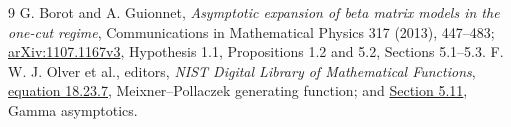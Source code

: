 \documentclass[11pt]{article}
\begin{document}
\begin{thebibliography}{9}
 G. Borot and A. Guionnet,
\emph{Asymptotic expansion of beta matrix models in the one-cut regime},
Communications in Mathematical Physics 317 (2013), 447--483;
\href{https://arxiv.org/abs/1107.1167}{arXiv:1107.1167v3},
Hypothesis 1.1, Propositions 1.2 and 5.2, Sections 5.1--5.3.
 F. W. J. Olver et al., editors,
\emph{NIST Digital Library of Mathematical Functions},
\href{https://dlmf.nist.gov/18.23.E7}{equation 18.23.7},
Meixner--Pollaczek generating function; and
\href{https://dlmf.nist.gov/5.11}{Section 5.11}, Gamma asymptotics.
\end{thebibliography}
\end{document}
